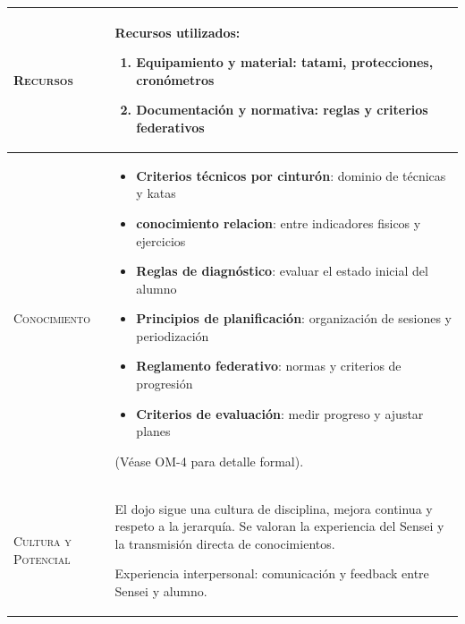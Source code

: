 \documentclass[12pt,a4paper,twoside,spanish]{article}      %
\begin{document}
\begin{table}[H]
\begin{tabularx}{\textwidth}{|l|X|}
                    \textsc{Recursos} &  
                    Recursos utilizados:
                    \begin{enumerate}
                        \item Equipamiento y material: tatami, protecciones, cronómetros
                        \item Documentación y normativa: reglas y criterios federativos
                    \end{enumerate} \\ \hline
                    
                    \textsc{Conocimiento} &  
                    \begin{itemize}
                        \item \textbf{Criterios técnicos por cinturón}: dominio de técnicas y katas
                        \item \textbf {conocimiento relacion}: entre indicadores fisicos y ejercicios
                        \item \textbf{Reglas de diagnóstico}: evaluar el estado inicial del alumno
                        \item \textbf{Principios de planificación}: organización de sesiones y periodización
                        \item \textbf{Reglamento federativo}: normas y criterios de progresión
                        \item \textbf{Criterios de evaluación}: medir progreso y ajustar planes
                    \end{itemize}
                    (Véase OM-4 para detalle formal). \\ \hline
                    
                    \textsc{Cultura y Potencial} &  
                    El dojo sigue una cultura de disciplina, mejora continua y respeto a la jerarquía.  
                    Se valoran la experiencia del Sensei y la transmisión directa de conocimientos. 
                    
                    Experiencia interpersonal: comunicación y feedback entre Sensei y alumno. \\ \hline
                    
                \end{tabularx}
                \label{tab.OM2}
            \end{table}
            
            
            
\end{document}
